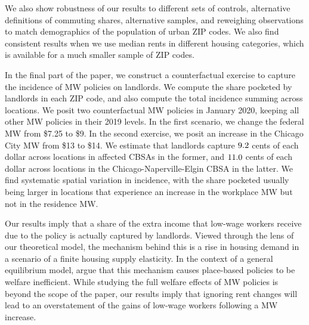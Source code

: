We also show robustness of our results to different sets of controls,
alternative definitions of commuting shares, alternative samples,
and reweighing observations to match demographics of the population of
urban ZIP codes.
We also find consistent results when we use median rents in different housing 
categories, which is available for a much smaller sample of ZIP codes.


In the final part of the paper, we construct a counterfactual exercise to 
capture the incidence of MW policies on landlords.
We compute the share pocketed by landlords in each ZIP code, and also
compute the total incidence summing across locations.
We posit two counterfactual MW policies in January 2020, keeping all other
MW policies in their 2019 levels.
In the first scenario, we change the federal MW from \$7.25 to \$9.
In the second exercise, we posit an increase in the Chicago City MW 
from \$13 to \$14.
We estimate that landlords capture $\textnormal{9.2}$ cents of each 
dollar across locations in affected CBSAs in the former, and 
$\textnormal{11.0}$ cents of each dollar across locations in the 
Chicago-Naperville-Elgin CBSA in the latter.
We find systematic spatial variation in incidence,
with the share pocketed usually being larger in locations that experience an
increase in the workplace MW but not in the residence MW.

Our results imply that a share of the extra income that low-wage workers
receive due to the policy is actually captured by landlords.
Viewed through the lens of our theoretical model,
the mechanism behind this is a rise in housing demand in a scenario of a 
finite housing supply elasticity.
In the context of a general equilibrium model, \textcite{KlineMoretti2014} argue
that this mechanism causes place-based policies to be welfare inefficient.
While studying the full welfare effects of MW policies is beyond the scope of 
the paper, our results imply that ignoring rent changes will lead to an 
overstatement of the gains of low-wage workers following a MW increase.


